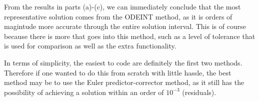 \documentclass[12pt]{article}
\begin{document}
From the results in parts (a)-(c), we can immediately conclude that the most
representative solution comes from the ODEINT method, as it is orders of
magintude more accurate through the entire solution interval. This is of course
because there is more that goes into this method, such as a level of tolerance
that is used for comparison as well as the extra functionality.

In terms of simplicity, the easiest to code are definitely the first two
methods. Therefore if one wanted to do this from scratch with little hassle,
the best method may be to use the Euler predictor-corrector method, as it still
has the possibility of achieving a solution within an order of $10^{-3}$
(residuals).
\end{document}
